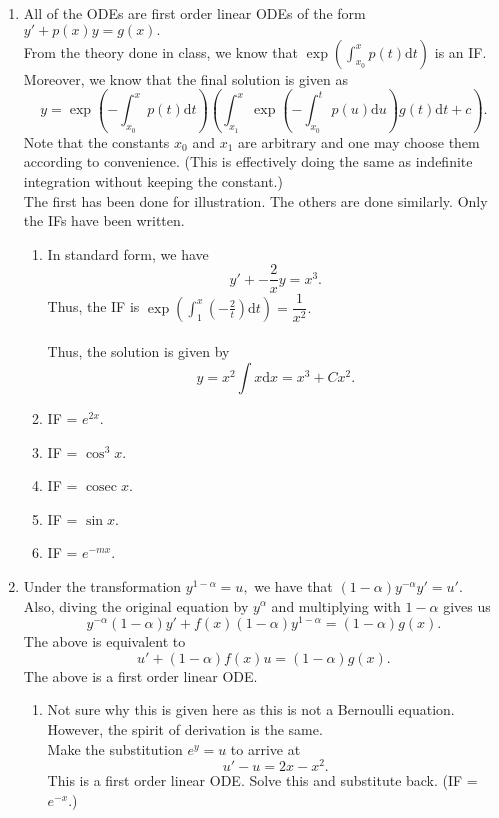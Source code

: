 \documentclass[12pt]{article}
\theoremstyle{definition}
\numberwithin{thm}{section}
\begin{document}
\begin{enumerate}[leftmargin=*, label = Q.\arabic*.]
	\item All of the ODEs are first order linear ODEs of the form $y' + p(x)y = g(x).$\\
	From the theory done in class, we know that $\exp\left(\displaystyle\int_{x_0}^{x} p(t) \text{d}t\right)$ is an IF.\\
	Moreover, we know that the final solution is given as 
	\[y = \exp\left(-\displaystyle\int_{x_0}^{x} p(t) \text{d}t\right)\left(\int_{x_1}^{x} \exp\left(-\displaystyle\int_{x_0}^{t} p(u) \text{d}u\right)g(t) \text{d}t + c\right).\]
	Note that the constants $x_0$ and $x_1$ are arbitrary and one may choose them according to convenience. (This is effectively doing the same as indefinite integration without keeping the constant.)\\
	The first has been done for illustration. The others are done similarly. Only the IFs have been written.
	\begin{enumerate}[label = (\roman*)] 
		\item In standard form, we have
		\[y' + -\frac{2}{x}y = x^3.\]
		Thus, the IF is $\displaystyle\exp\left(\int_{1}^{x} \left(-\frac{2}{t}\right) \text{d}t\right) = \dfrac{1}{x^2}.$\\~\\
		Thus, the solution is given by
		\[y = x^2\int x \text{d}x = x^3 + Cx^2.\]
		\item IF = $e^{2x}.$
		\item IF = $\cos^3 x.$
		\item IF = $\operatorname{cosec} x.$
		\item IF = $\sin x.$
		\item IF = $e^{-mx}.$
	\end{enumerate}
	\item Under the transformation $y^{1 - \alpha} = u,$ we have that $(1 - \alpha)y^{-\alpha} y' = u'.$\\
	Also, diving the original equation by $y^\alpha$ and multiplying with $1 - \alpha$ gives us
	\[y^{-\alpha}(1 - \alpha)y' + f(x)(1 - \alpha)y^{1-\alpha} = (1 - \alpha)g(x).\]
	The above is equivalent to
	\[u' + (1 - \alpha)f(x)u = (1 - \alpha)g(x).\]
	The above is a first order linear ODE.
	\begin{enumerate}[label = (\roman*)] 
		\item Not sure why this is given here as this is not a Bernoulli equation. However, the spirit of derivation is the same.\\
		Make the substitution $e^y = u$ to arrive at
		\[u' - u = 2x - x^2.\]
		This is a first order linear ODE. Solve this and substitute back. (IF = $e^{-x}.$)

\end{enumerate}
\end{enumerate}
\end{document}
